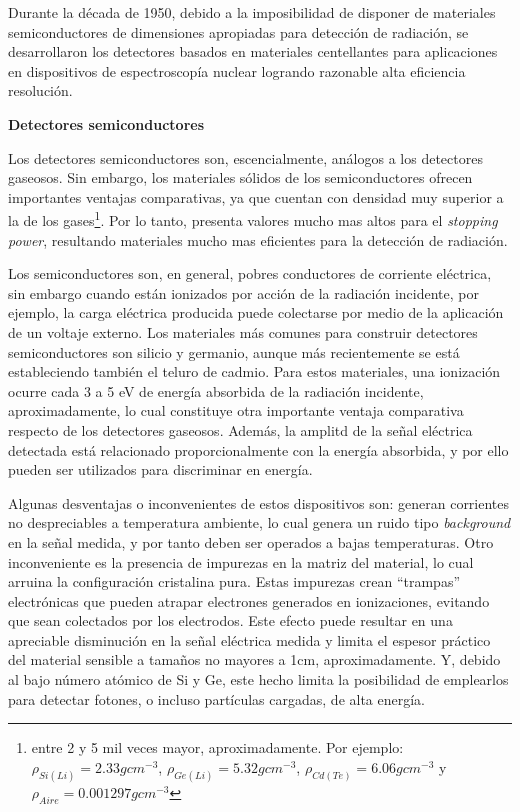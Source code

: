 Durante la d\'ecada de 1950, debido a la imposibilidad de disponer de materiales semiconductores de dimensiones apropiadas para detecci\'on 
 de radiaci\'on, se desarrollaron los detectores basados en materiales centellantes para aplicaciones en dispositivos de espectroscop\'ia 
 nuclear logrando razonable alta eficiencia resoluci\'on.
 
\begin{center}
\textbf{Detectores semiconductores}
\end{center}

Los detectores semiconductores son, escencialmente, an\'alogos a los detectores gaseosos. Sin embargo, los materiales s\'olidos de los 
semiconductores ofrecen 
importantes ventajas comparativas, ya que cuentan con densidad muy superior a la de los gases\footnote{entre 2 y 5 mil veces mayor, 
aproximadamente. Por ejemplo: 
$\rho_{Si(Li)}=2.33gcm^{-3}$, $\rho_{Ge(Li)}=5.32gcm^{-3}$, $\rho_{Cd(Te)}=6.06gcm^{-3}$ y $\rho_{Aire}=0.001297gcm^{-3}$}. Por lo tanto, 
presenta valores mucho 
mas altos para el \textit{stopping power}, resultando materiales mucho mas eficientes para la detecci\'on de radiaci\'on.
%

%
Los semiconductores son, en general, pobres conductores de corriente el\'ectrica, sin embargo cuando est\'an ionizados por acci\'on de la 
radiaci\'on incidente, 
por ejemplo, la carga el\'ectrica producida puede colectarse por medio de la aplicaci\'on de un voltaje externo. Los materiales m\'as 
comunes para construir 
detectores semiconductores son silicio y germanio, aunque m\'as recientemente se est\'a estableciendo tambi\'en el teluro de cadmio. 
Para estos materiales, una 
ionizaci\'on ocurre cada 3 a 5 eV de energ\'ia absorbida de la radiaci\'on incidente, aproximadamente, lo cual constituye otra importante 
ventaja comparativa 
respecto de los detectores gaseosos. Adem\'as, la amplitd de la se\~nal el\'ectrica detectada est\'a relacionado proporcionalmente con la 
energ\'ia absorbida, y 
por ello pueden ser utilizados para discriminar en energ\'ia.
%

%
Algunas desventajas o inconvenientes de estos dispositivos son: generan corrientes no despreciables a temperatura ambiente, lo cual genera 
un ruido tipo 
\textit{background} en la se\~nal medida, y por tanto deben ser operados a bajas temperaturas. Otro inconveniente es la presencia de 
impurezas en la matriz del 
material, lo cual arruina la configuraci\'on cristalina pura. Estas impurezas crean ``trampas'' electr\'onicas que pueden atrapar electrones 
generados en 
ionizaciones, evitando que sean colectados por los electrodos. Este efecto puede resultar en una apreciable disminuci\'on en la se\~nal 
el\'ectrica medida y 
limita el espesor pr\'actico del material sensible a tama\~nos no mayores a 1cm, aproximadamente. Y, debido al bajo n\'umero at\'omico de 
Si y Ge, este hecho 
limita la posibilidad de emplearlos para detectar fotones, o incluso part\'iculas cargadas, de alta energ\'ia. 
%

